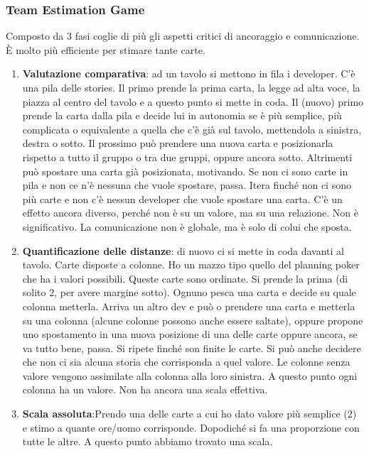 \subsubsection{Team Estimation Game}
Composto da 3 fasi coglie di più gli aspetti critici di ancoraggio e comunicazione.\\ È molto più efficiente per stimare tante carte.
\begin{enumerate}
    \item \textbf{Valutazione comparativa}: ad un tavolo si mettono in fila i developer. C'è una pila delle stories. Il primo prende la prima carta, la legge ad alta voce, la piazza al centro del tavolo e a questo punto si mette in coda. Il (nuovo) primo prende la carta dalla pila e decide lui in autonomia se è più semplice, più complicata o equivalente a quella che c'è già sul tavolo, mettendola a sinistra, destra o sotto. Il prossimo può prendere una nuova carta e posizionarla rispetto a tutto il gruppo o tra due gruppi, oppure ancora sotto. Altrimenti può spostare una carta già posizionata, motivando. Se non ci sono carte in pila e non ce n'è nessuna che vuole spostare, passa. Itera finché non ci sono più carte e non c'è nessun developer che vuole spostare una carta. C'è un effetto ancora diverso, perché non è su un valore, ma su una relazione. Non è significativo. La comunicazione non è globale, ma è solo di colui che sposta.
    \item \textbf{Quantificazione delle distanze}: di nuovo ci si mette in coda davanti al tavolo. Carte disposte a colonne. Ho un mazzo tipo quello del planning poker che ha i valori possibili. Queste carte sono ordinate. Si prende la prima (di solito 2, per avere margine sotto). Ognuno pesca una carta e decide su quale colonna metterla. Arriva un altro dev e può o prendere una carta e metterla su una colonna (alcune colonne possono anche essere saltate), oppure propone uno spostamento in una nuova posizione di una delle carte oppure ancora, se va tutto bene, passa. Si ripete finché son finite le carte. Si può anche decidere che non ci sia alcuna storia che corrisponda a quel valore. Le colonne senza valore vengono assimilate alla colonna alla loro sinistra. A questo punto ogni colonna ha un valore. Non ha ancora una scala effettiva.
    \item \textbf{Scala assoluta}:Prendo una delle carte a cui ho dato valore più semplice (2) e stimo a quante ore/uomo corrisponde. Dopodiché si fa una proporzione con tutte le altre. A questo punto abbiamo trovato una scala.
\end{enumerate}
